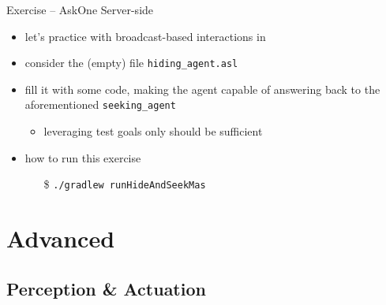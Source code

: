 \documentclass[presentation]{beamer}\mode<presentation>{\usetheme{AMSBolognaFC}}
\begin{document}
\begin{frame}[c, allowframebreaks]{Exercise \theJasonExample{} -- AskOne Server-side}
\begin{itemize}
    \item let's practice with broadcast-based interactions in \jason{}
    
    \vspace{.3cm}
    
    \item consider the (empty) file \texttt{hiding\_agent.asl}
    
    \vspace{.3cm}
    
    \item fill it with some \jason{} code, making the agent capable of answering back to the aforementioned \texttt{seeking\_agent}
    \begin{itemize}
        \item leveraging test goals only should be sufficient
    \end{itemize}
    
    \vspace{.3cm}
    
    \item how to run this exercise
    \begin{itemize}
        \item[\$] \texttt{./gradlew run\alert{HideAndSeek}Mas}
    \end{itemize}
    
\end{itemize}
\end{frame}

\section{\jason{} Advanced}

\subsection{Perception \& Actuation}
\end{document}
